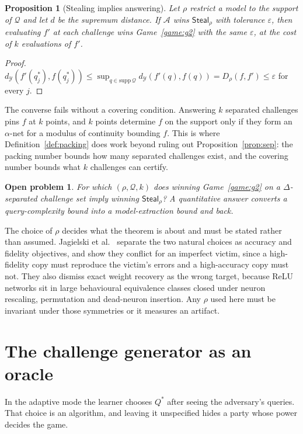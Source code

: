 \documentclass[11pt]{article}
\theoremstyle{definition}
\theoremstyle{plain}
\newtheorem{proposition}{Proposition}
\newtheorem{openq}{Open problem}
\newcommand{\A}{\mathcal{A}}
\newcommand{\Y}{\mathcal{Y}}
\newcommand{\Q}{\mathcal{Q}}
\begin{document}
\begin{proposition}[Stealing implies answering]
\label{prop:steal}
Let $\rho$ restrict a model to the support of $\Q$ and let $d$ be the supremum
distance. If $\A$ wins $\mathsf{Steal}_\rho$ with tolerance $\varepsilon$, then
evaluating $f'$ at each challenge wins Game~\ref{game:g2} with the same
$\varepsilon$, at the cost of $k$ evaluations of $f'$.
\end{proposition}

\begin{proof}
$d_\Y(f'(q^*_j), f(q^*_j)) \le \sup_{q \in \mathrm{supp}\,\Q} d_\Y(f'(q),f(q)) =
D_\rho(f,f') \le \varepsilon$ for every $j$.
\end{proof}

The converse fails without a covering condition. Answering $k$ separated challenges
pins $f$ at $k$ points, and $k$ points determine $f$ on the support only if they
form an $\alpha$-net for a modulus of continuity bounding $f$. This is where
Definition~\ref{def:packing} does work beyond ruling out
Proposition~\ref{prop:sep}: the packing number bounds how many separated challenges
exist, and the covering number bounds what $k$ challenges can certify.

\begin{openq}
For which $(\rho, \Q, k)$ does winning Game~\ref{game:g2} on a $\Delta$-separated
challenge set imply winning $\mathsf{Steal}_\rho$? A quantitative answer converts a
query-complexity bound into a model-extraction bound and back.
\end{openq}

The choice of $\rho$ decides what the theorem is about and must be stated rather
than assumed. Jagielski et al.~\cite{JCBKP20} separate the two natural choices as
accuracy and fidelity objectives, and show they conflict for an imperfect victim,
since a high-fidelity copy must reproduce the victim's errors and a high-accuracy
copy must not. They also dismiss exact weight recovery as the wrong target, because
ReLU networks sit in large behavioural equivalence classes closed under neuron
rescaling, permutation and dead-neuron insertion. Any $\rho$ used here must be
invariant under those symmetries or it measures an artifact.

\section{The challenge generator as an oracle}
\label{sec:oracle}

In the adaptive mode the learner chooses $Q^*$ after seeing the adversary's
queries. That choice is an algorithm, and leaving it unspecified hides a party
whose power decides the game.
\end{document}

